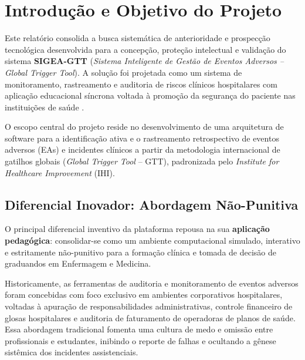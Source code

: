 \chapter{Introdução e Objetivo do Projeto}
\label{cap_introducao_objetivo}

Este relatório consolida a busca sistemática de anterioridade e prospecção tecnológica desenvolvida para a concepção, proteção intelectual e validação do sistema \textbf{SIGEA-GTT} (\textit{Sistema Inteligente de Gestão de Eventos Adversos -- Global Trigger Tool}). A solução foi projetada como um sistema de monitoramento, rastreamento e auditoria de riscos clínicos hospitalares com aplicação educacional síncrona voltada à promoção da segurança do paciente nas instituições de saúde \cite{ihi2009}.

O escopo central do projeto reside no desenvolvimento de uma arquitetura de software para a identificação ativa e o rastreamento retrospectivo de eventos adversos (EAs) e incidentes clínicos a partir da metodologia internacional de gatilhos globais (\textit{Global Trigger Tool} -- GTT), padronizada pelo \textit{Institute for Healthcare Improvement} (IHI). 

\section{Diferencial Inovador: Abordagem Não-Punitiva}
\label{sec_diferencial_inovador}

O principal diferencial inventivo da plataforma repousa na sua \textbf{aplicação pedagógica}: consolidar-se como um ambiente computacional simulado, interativo e estritamente não-punitivo para a formação clínica e tomada de decisão de graduandos em Enfermagem e Medicina.

Historicamente, as ferramentas de auditoria e monitoramento de eventos adversos foram concebidas com foco exclusivo em ambientes corporativos hospitalares, voltadas à apuração de responsabilidades administrativas, controle financeiro de glosas hospitalares e auditoria de faturamento de operadoras de planos de saúde. Essa abordagem tradicional fomenta uma cultura de medo e omissão entre profissionais e estudantes, inibindo o reporte de falhas e ocultando a gênese sistêmica dos incidentes assistenciais.

